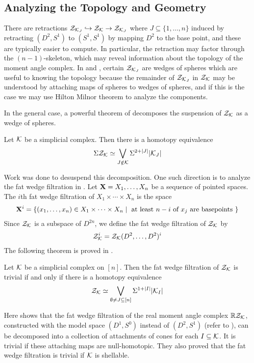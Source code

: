 \documentclass[a4paper]{article}
\begin{document}
\subsection*{Analyzing the Topology and Geometry}
There are retractions $\mathcal{Z}_{\mathcal{K}_J}\hookrightarrow\mathcal{Z}_{\mathcal{K}}\to\mathcal{Z}_{\mathcal{K}_J}$ where $J\subseteq\{1,\dots,n\}$ induced by retracting $(D^2,S^1)$ to $(S^1,S^1)$ by mapping $D^2$ to the base point, and these are typically easier to compute. In particular, the retraction may factor through the $(n-1)$-skeleton, which may reveal information about the topology of the moment angle complex. In \cite{Amaranta} and \cite{Iriye}, certain $\mathcal{Z}_{\mathcal{K}_J}$ are wedges of spheres which are useful to knowing the topology because the remainder of $\mathcal{Z}_{\mathcal{K}_J}$ in $\mathcal{Z}_{\mathcal{K}}$ may be understood by attaching maps of spheres to wedges of spheres, and if this is the case we may use Hilton Milnor theorem to analyze the components. 

In the general case, a powerful theorem of \cite{BBCG} decomposes the suspension of $\mathcal{Z}_{\mathcal{K}}$ as a wedge of spheres. 

\begin{thm}
Let $\mathcal{K}$ be a simplicial complex. Then there is a homotopy equivalence $$\Sigma\mathcal{Z}_{\mathcal{K}}\simeq\bigvee_{J\notin\mathcal{K}}\Sigma^{2+\abs{J}}\abs{\mathcal{K}_J}$$
\end{thm}

Work was done to desuspend this decomposition. One such direction is to analyze the fat wedge filtration in \cite{IK}. Let $\bold{X}=X_1,\dots,X_n$ be a sequence of pointed spaces. The $i$th fat wedge filtration of $X_1\times\cdots\times X_n$ is the space $$\bold{X}^i=\{(x_1,\dots,x_n)\in X_1\times\cdots\times X_n\;|\;\text{ at least }n-i\text{ of }x_j\text{ are basepoints }\}$$ Since $\mathcal{Z}_{\mathcal{K}}$ is a subspace of $D^{2n}$, we define the fat wedge filtration of $\mathcal{Z}_{\mathcal{K}}$ by $$\mathcal{Z}_{\mathcal{K}}^i=\mathcal{Z}_{\mathcal{K}}(D^2,\dots,D^2)^i$$ The following theorem is proved in \cite{IK}. 

\begin{thm}
Let $\mathcal{K}$ be a simplicial complex on $[n]$. Then the fat wedge filtration of $\mathcal{Z}_{\mathcal{K}}$ is trivial if and only if there is a homotopy equivalence $$\mathcal{Z}_{\mathcal{K}}\simeq\bigvee_{\emptyset\neq J\subseteq[n]}\Sigma^{1+\abs{I}}\abs{\mathcal{K}_I}$$
\end{thm}

Here \cite{IK} shows that the fat wedge filtration of the real moment angle complex $\mathbb{R}\mathcal{Z}_{\mathcal{K}}$, constructed with the model space $(D^1,S^0)$ instead of $(D^2,S^1)$ (refer to \cite{ToricTopology}), can be decomposed into a collection of attachments of cones for each $I\subseteq\mathcal{K}$. It is trivial if these attaching maps are null-homotopic. They also proved that the fat wedge filtration is trivial if $\mathcal{K}$ is shellable. 
\end{document}

